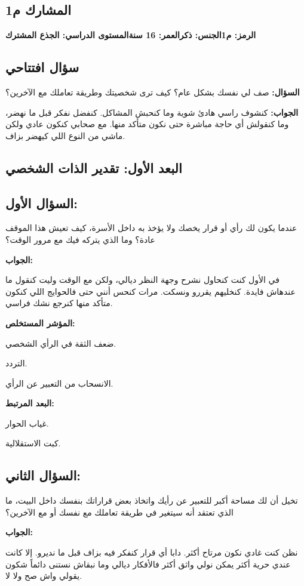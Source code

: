 \documentclass[12pt,oneside]{report}
\begin{document}
\subsection*{المشارك م1}
\noindent\textbf{الرمز: م1\quad الجنس: ذكر\quad العمر: 16 سنة\quad المستوى الدراسي: الجذع المشترك}\par
\subsection*{سؤال افتتاحي}
\noindent\textbf{السؤال:} صف لي نفسك بشكل عام؟    كيف ترى شخصيتك وطريقة تعاملك مع الآخرين؟\par
\noindent\textbf{الجواب:} كنشوف راسي هادئ شوية وما كنحبش المشاكل. كنفضل نفكر قبل ما نهضر، وما كنقولش أي حاجة مباشرة حتى نكون متأكد منها. مع صحابي كنكون عادي ولكن ماشي من النوع اللي كيهضر بزاف.\par
\subsection*{البعد الأول: تقدير الذات الشخصي}
\subsection*{السؤال الأول:}
عندما يكون لك رأي أو قرار يخصك ولا يؤخذ به داخل الأسرة، كيف تعيش هذا الموقف عادة؟   وما الذي يتركه فيك مع مرور الوقت؟

\noindent\textbf{الجواب:}\par
في الأول كنت كنحاول نشرح وجهة النظر ديالي، ولكن مع الوقت وليت كنقول ما عندهاش فايدة. كنخليهم يقررو ونسكت. مرات كنحس أنني حتى فالحوايج اللي كنكون متأكد منها كنرجع نشك فراسي.

\noindent\textbf{المؤشر المستخلص:}\par
ضعف الثقة في الرأي الشخصي.

التردد.

الانسحاب من التعبير عن الرأي.

\noindent\textbf{البعد المرتبط:}\par
غياب الحوار.

كبت الاستقلالية.

\subsection*{السؤال الثاني:}
تخيل أن لك مساحة أكبر للتعبير عن رأيك واتخاذ بعض قراراتك بنفسك داخل البيت، ما الذي تعتقد أنه سيتغير في طريقة تعاملك مع نفسك أو مع الآخرين؟

\noindent\textbf{الجواب:}\par
نظن كنت غادي نكون مرتاح أكثر. دابا أي قرار كنفكر فيه بزاف قبل ما نديرو. إلا كانت عندي حرية أكثر يمكن نولي واثق أكثر فالأفكار ديالي وما نبقاش نستنى دائماً شكون يقولي واش صح ولا لا.
\end{document}
